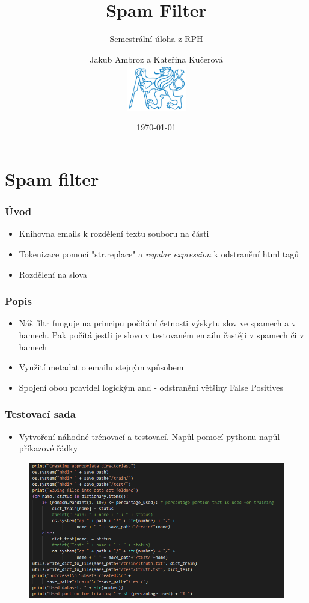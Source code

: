 \documentclass{beamer}
\title{Spam Filter}
\subtitle{Semestrální úloha z RPH}
\author[Jakub Ambroz a Kateřina Kučerová]{Jakub Ambroz a Kateřina Kučerová\\ \includegraphics[height=2cm]{logo.png}}
\institute[ČVUT]{České vysoké učení technické}
\date{\today}
\begin{document}
	\begin{frame}
		\maketitle
	\end{frame}
\section{Spam filter}	
\begin{frame}
\frametitle{Úvod}
\begin{itemize}
\item Knihovna emails k rozdělení textu souboru na části
\item Tokenizace pomocí "str.replace" a \emph{regular expression} k odstranění html tagů
\item Rozdělení na slova
\end{itemize}
\end{frame}
\begin{frame}
	\frametitle{Popis}
	\begin{itemize}
		\item Náš filtr funguje na principu počítání četnosti výskytu slov ve spamech a v hamech. Pak počítá jestli je slovo v testovaném emailu častěji v spamech či v hamech
		\item Využití metadat o emailu stejným způsobem
		\item Spojení obou pravidel logickým and - odstranění většiny False Positives
	\end{itemize}
\end{frame}
\begin{frame}
	\frametitle{Testovací sada}
	\begin{itemize}
		\item Vytvoření náhodné trénovací a testovací. Napůl pomocí pythonu napůl příkazové řádky
	\end{itemize}
	\begin{figure}
		\centering
		\includegraphics[width=1\textwidth]{shell.png}
	\end{figure}
\end{frame}
\end{document}

